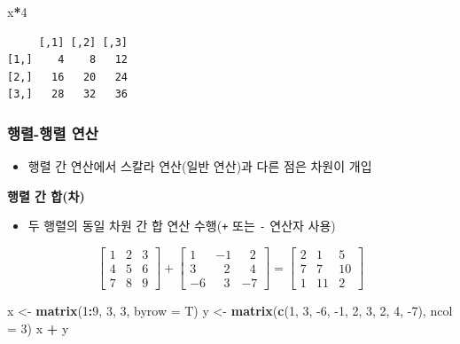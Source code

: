 \documentclass[
  11pt,
]{krantz}
\newenvironment{Shaded}{\begin{snugshade}}{\end{snugshade}}
\newcommand{\DataTypeTok}[1]{\textcolor[rgb]{0.27,0.27,0.27}{#1}}
\newcommand{\DecValTok}[1]{\textcolor[rgb]{0.06,0.06,0.06}{#1}}
\newcommand{\KeywordTok}[1]{\textcolor[rgb]{0.27,0.27,0.27}{\textbf{#1}}}
\newcommand{\NormalTok}[1]{#1}
\newcommand{\OperatorTok}[1]{\textcolor[rgb]{0.43,0.43,0.43}{\textbf{#1}}}
\newcommand{\StringTok}[1]{\textcolor[rgb]{0.5,0.5,0.5}{#1}}
\providecommand{\tightlist}{%
  \setlength{\itemsep}{0pt}\setlength{\parskip}{0pt}}
\begin{document}
\footnotesize

\begin{Shaded}
\begin{Highlighting}[]
\NormalTok{x}\OperatorTok{*}\DecValTok{4}
\end{Highlighting}
\end{Shaded}

\begin{verbatim}
     [,1] [,2] [,3]
[1,]    4    8   12
[2,]   16   20   24
[3,]   28   32   36
\end{verbatim}

\normalsize

\hypertarget{mat-op-m}{%
\subsubsection*{\texorpdfstring{\textbf{행렬-행렬 연산}}{행렬-행렬 연산}}\label{mat-op-m}}


\begin{itemize}
\tightlist
\item
  행렬 간 연산에서 스칼라 연산(일반 연산)과 다른 점은 차원이 개입
\end{itemize}

\textbf{행렬 간 합(차)}

\begin{itemize}
\tightlist
\item
  두 행렬의 동일 차원 간 합 연산 수행(\texttt{+} 또는 \texttt{-} 연산자 사용)
\end{itemize}

\[\begin{bmatrix}
1 & 2 & 3 \\
4 & 5 & 6 \\ 
7 & 8 & 9
\end{bmatrix} +  
\begin{bmatrix}
1 & -1 & ~~~2 \\
3 & ~~~2 & ~~~4 \\ 
-6 & ~~~3 & -7
\end{bmatrix} 
 = 
\begin{bmatrix}
2  & 1  & 5 \\
7  & 7  & 10 \\ 
1  & 11 & 2
\end{bmatrix}
\]

\footnotesize

\begin{Shaded}
\begin{Highlighting}[]
\NormalTok{x <-}\StringTok{ }\KeywordTok{matrix}\NormalTok{(}\DecValTok{1}\OperatorTok{:}\DecValTok{9}\NormalTok{, }\DecValTok{3}\NormalTok{, }\DecValTok{3}\NormalTok{, }\DataTypeTok{byrow =}\NormalTok{ T)}
\NormalTok{y <-}\StringTok{ }\KeywordTok{matrix}\NormalTok{(}\KeywordTok{c}\NormalTok{(}\DecValTok{1}\NormalTok{, }\DecValTok{3}\NormalTok{, }\DecValTok{-6}\NormalTok{, }\DecValTok{-1}\NormalTok{, }\DecValTok{2}\NormalTok{, }\DecValTok{3}\NormalTok{, }\DecValTok{2}\NormalTok{, }\DecValTok{4}\NormalTok{, }\DecValTok{-7}\NormalTok{), }\DataTypeTok{ncol =} \DecValTok{3}\NormalTok{)}
\NormalTok{x }\OperatorTok{+}\StringTok{ }\NormalTok{y}
\end{Highlighting}
\end{Shaded}
\end{document}
